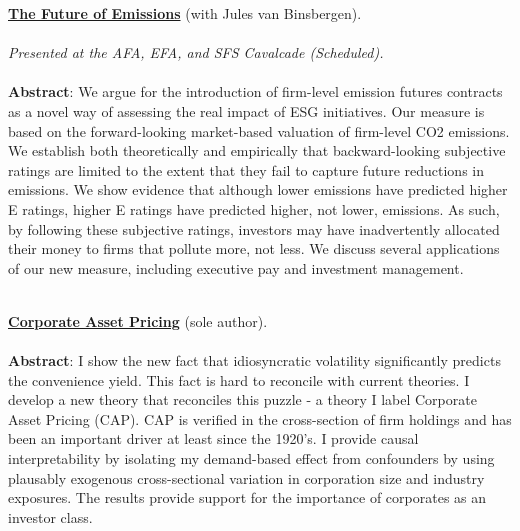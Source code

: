 \documentclass[11pt]{res} %
\begin{document}
\begin{resume}
\begin{etaremune}
\item \href{https://papers.ssrn.com/abstract=4241164}{\bf The Future of Emissions} (with Jules van Binsbergen). \\
\\[-0.9em]
\textit{Presented at the AFA, EFA, and SFS Cavalcade (Scheduled).} \\ %
\\[-0.9em]
\textbf{Abstract}: 
We argue for the introduction of firm-level emission futures contracts as a novel way of assessing the real impact of ESG initiatives. Our measure is based on the forward-looking market-based valuation of firm-level CO2 emissions. We establish both theoretically and empirically that backward-looking subjective ratings are limited to the extent that they fail to capture future reductions in emissions. We show evidence that although lower emissions have predicted higher E ratings, higher E ratings have predicted higher, not lower, emissions. As such, by following these subjective ratings, investors may have inadvertently allocated their money to firms that pollute more, not less. We discuss several applications of our new measure, including executive pay and investment management.\\
\\[-0.9em]

\item \href{http://andreasbrogger.com/CorporateAssetPricing.pdf}{\bf Corporate Asset Pricing} (sole author).\\
\\[-0.9em]
\textbf{Abstract}: 
I show the new fact that idiosyncratic volatility significantly predicts the convenience yield. This fact is hard to reconcile with current theories. I develop a new theory that reconciles this puzzle - a theory I label Corporate Asset Pricing (CAP). CAP is verified in the cross-section of firm holdings and has been an important driver at least since the 1920’s. I provide causal interpretability by isolating my demand-based effect from confounders by using plausably exogenous cross-sectional variation in corporation size and industry exposures. The results provide support for the importance of corporates as an investor class.\\
\\[-0.9em]



\end{etaremune}
\end{resume}
\end{document}
